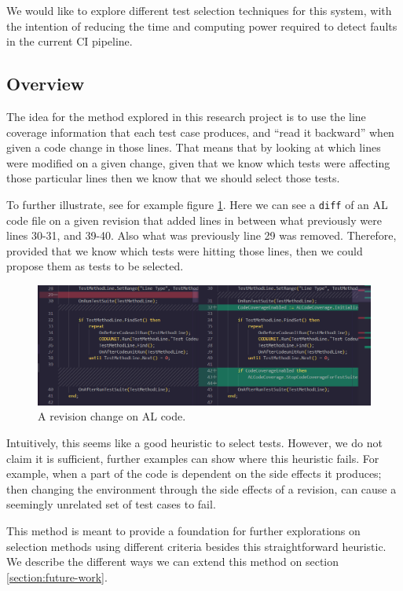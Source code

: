 \documentclass{article}
\begin{document}
   We would like to explore different test selection techniques for this system, with the intention of reducing the time and computing power required to detect faults in the current CI pipeline.

\subsection{Overview}\label{section:overview}

The idea for the method explored in this research project is to use the line coverage information that each test case produces, and ``read it backward'' when given a code change in those lines. That means that by looking at which lines were modified on a given change, given that we know which tests were affecting those particular lines then we know that we should select those tests.

To further illustrate, see for example figure \ref{fig:diff}. Here we can see a \texttt{diff} of an AL code file on a given revision that added lines in between what previously were lines 30-31, and 39-40. Also what was previously line 29 was removed. Therefore, provided that we know which tests were hitting those lines, then we could propose them as tests to be selected.

\begin{figure}[H]
  \includegraphics[width=\textwidth]{images/diff.png}
  \caption{A revision change on AL code.}
  \label{fig:diff}
\end{figure}

Intuitively, this seems like a good heuristic to select tests. However, we do not claim it is sufficient, further examples can show where this heuristic fails. For example, when a part of the code is dependent on the side effects it produces; then changing the environment through the side effects of a revision, can cause a seemingly unrelated set of test cases to fail.

This method is meant to provide a foundation for further explorations on selection methods using different criteria besides this straightforward heuristic. We describe the different ways we can extend this method on section \ref{section:future-work}.
\end{document}
